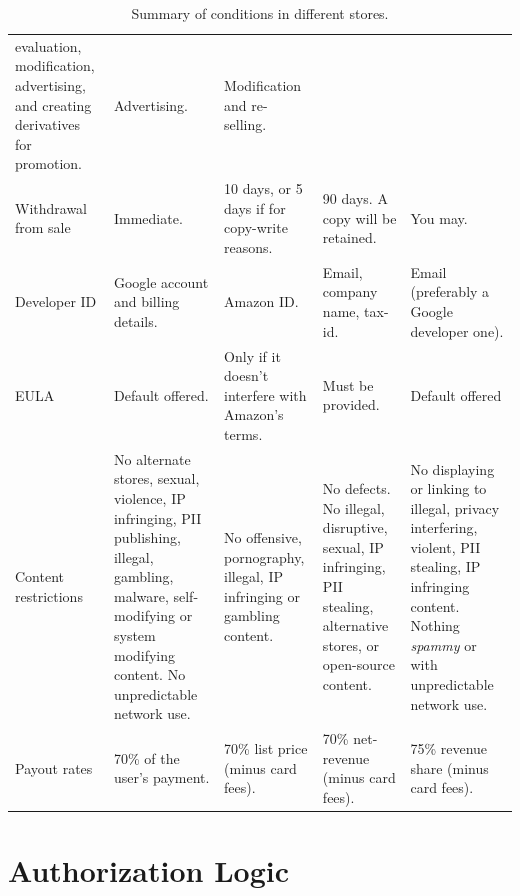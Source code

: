 \documentclass[thesis.tex]{subfiles}
\begin{document}
\begin{table}
\begin{tabulary}{\linewidth}{lLLLL}
    evaluation, modification, advertising, and creating derivatives for
    promotion. & Advertising. & Modification and re-selling.\\
    Withdrawal from sale & Immediate. & 10 days, or 5 days if for copy-write
    reasons. & 90 days. A copy will be retained. & You may.\\
    Developer ID & Google account and billing details. & Amazon ID. & Email,
    company name, tax-id. & Email (preferably a Google developer
    one).\\
    EULA & Default offered. & Only if it doesn't interfere with Amazon's
    terms. & Must be provided. & Default offered\\
    Content restrictions & No alternate stores, sexual, violence, IP
    infringing, PII publishing, illegal, gambling, malware, self-modifying
    or system modifying content. No unpredictable network use. & No
    offensive, pornography, illegal, IP infringing or gambling content. & No
    defects. No illegal, disruptive, sexual, IP infringing, PII stealing,
    alternative stores, or open-source content. & No displaying or linking
    to illegal, privacy interfering, violent, PII stealing, IP infringing
    content. Nothing \emph{spammy} or with unpredictable network
    use.\\
    Payout rates & 70\% of the user's payment. & 70\% list price (minus card
    fees). & 70\% net-revenue (minus card fees). & 75\% revenue share (minus
    card fees).\\
    \bottomrule
  \end{tabulary}
  \label{tab:store-tandcs}
  \caption{Summary of conditions in different stores.}
\end{table}

\section{Authorization Logic}
\label{sec:authorization-logic}
\end{document}
